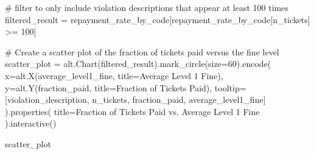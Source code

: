 \documentclass[
  letterpaper,
  DIV=11,
  numbers=noendperiod]{scrartcl}
\newenvironment{Shaded}{\begin{snugshade}}{\end{snugshade}}
\newcommand{\CommentTok}[1]{\textcolor[rgb]{0.37,0.37,0.37}{#1}}
\newcommand{\DecValTok}[1]{\textcolor[rgb]{0.68,0.00,0.00}{#1}}
\newcommand{\NormalTok}[1]{\textcolor[rgb]{0.00,0.23,0.31}{#1}}
\newcommand{\OperatorTok}[1]{\textcolor[rgb]{0.37,0.37,0.37}{#1}}
\newcommand{\StringTok}[1]{\textcolor[rgb]{0.13,0.47,0.30}{#1}}
\begin{document}
\begin{Shaded}
\begin{Highlighting}[]
\CommentTok{\# filter to only include violation descriptions that appear at least 100 times}
\NormalTok{filtered\_result }\OperatorTok{=}\NormalTok{ repayment\_rate\_by\_code[repayment\_rate\_by\_code[}\StringTok{\textquotesingle{}n\_tickets\textquotesingle{}}\NormalTok{] }\OperatorTok{\textgreater{}=} \DecValTok{100}\NormalTok{]}

\CommentTok{\# Create a scatter plot of the fraction of tickets paid versus the fine level}
\NormalTok{scatter\_plot }\OperatorTok{=}\NormalTok{ alt.Chart(filtered\_result).mark\_circle(size}\OperatorTok{=}\DecValTok{60}\NormalTok{).encode(}
\NormalTok{    x}\OperatorTok{=}\NormalTok{alt.X(}\StringTok{\textquotesingle{}average\_level1\_fine\textquotesingle{}}\NormalTok{, title}\OperatorTok{=}\StringTok{\textquotesingle{}Average Level 1 Fine\textquotesingle{}}\NormalTok{),}
\NormalTok{    y}\OperatorTok{=}\NormalTok{alt.Y(}\StringTok{\textquotesingle{}fraction\_paid\textquotesingle{}}\NormalTok{, title}\OperatorTok{=}\StringTok{\textquotesingle{}Fraction of Tickets Paid\textquotesingle{}}\NormalTok{),}
\NormalTok{    tooltip}\OperatorTok{=}\NormalTok{[}\StringTok{\textquotesingle{}violation\_description\textquotesingle{}}\NormalTok{, }\StringTok{\textquotesingle{}n\_tickets\textquotesingle{}}\NormalTok{, }\StringTok{\textquotesingle{}fraction\_paid\textquotesingle{}}\NormalTok{, }\StringTok{\textquotesingle{}average\_level1\_fine\textquotesingle{}}\NormalTok{]}
\NormalTok{).properties(}
\NormalTok{    title}\OperatorTok{=}\StringTok{\textquotesingle{}Fraction of Tickets Paid vs. Average Level 1 Fine\textquotesingle{}}
\NormalTok{).interactive()}

\NormalTok{scatter\_plot}
\end{Highlighting}
\end{Shaded}
\end{document}
